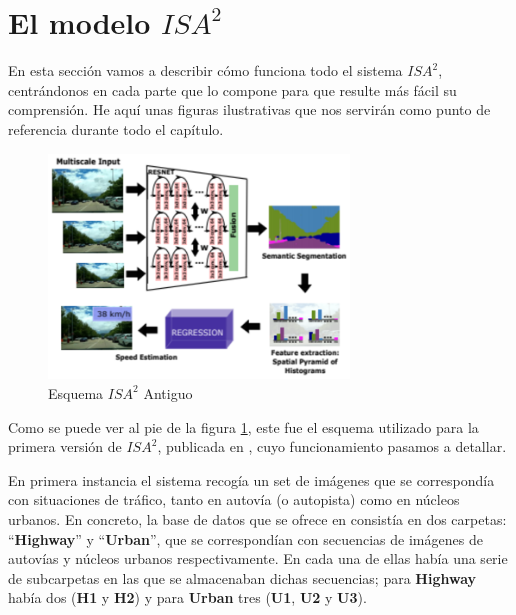 \section{El modelo $ISA^{2}$}
\label{sec:isa2_model}

En esta sección vamos a describir cómo funciona todo el sistema $ISA^{2}$, centrándonos en cada parte que lo compone para que resulte más fácil su comprensión. He aquí unas figuras ilustrativas que nos servirán como punto de referencia durante todo el capítulo.


\begin{figure}[H]
  \centering
  \includegraphics[width=8cm]{Figuras/Figura_Esquema_ISA2_Version_1_SegSem.eps}
  \caption{Esquema $ISA^{2}$ Antiguo}
  \label{fig:Isa_v1}
\end{figure}

Como se puede ver al pie de la figura \ref{fig:Isa_v1}, este fue el esquema utilizado para la primera versión de $ISA^{2}$, publicada en \cite{isa2}, cuyo funcionamiento pasamos a detallar.


En primera instancia el sistema recogía un set de imágenes que se correspondía con situaciones de tráfico, tanto en autovía (o autopista) como en núcleos urbanos. En concreto, la base de datos que se ofrece en \cite{isa2} consistía en dos carpetas: ``\textbf{Highway}'' y ``\textbf{Urban}'', que se correspondían con secuencias de imágenes de autovías y núcleos urbanos respectivamente. En cada una de ellas había una serie de subcarpetas en las que se almacenaban dichas secuencias; para \textbf{Highway} había dos (\textbf{H1} y \textbf{H2}) y para \textbf{Urban} tres (\textbf{U1}, \textbf{U2} y \textbf{U3}).

